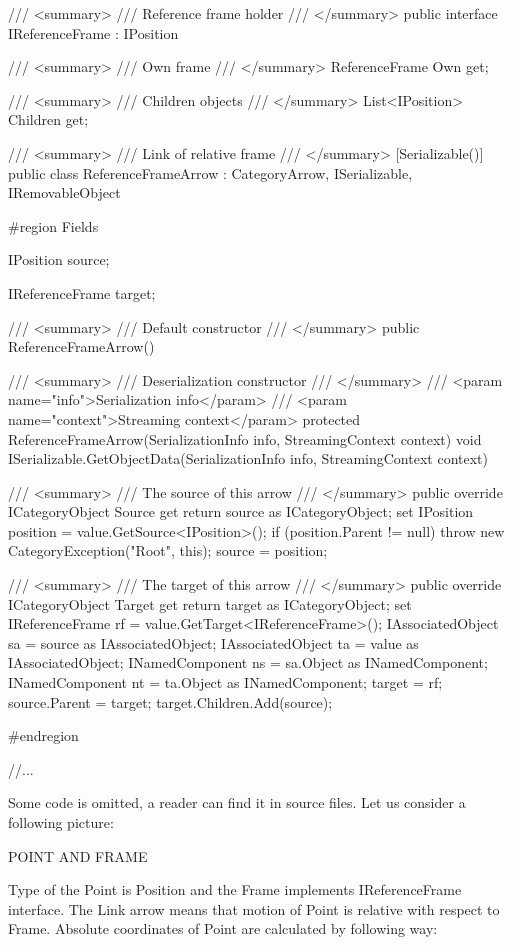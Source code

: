 \documentclass[10pt,journal,compsoc]{IEEEtran}
\begin{document}
/// <summary>
/// Reference frame holder
/// </summary>
public interface IReferenceFrame : IPosition
{
	/// <summary>
	/// Own frame
	/// </summary>
	ReferenceFrame Own
	{
		get;
	}
	
	/// <summary>
	/// Children objects
	/// </summary>
	List<IPosition> Children
	{
		get;
	}
	
}
/// <summary>
/// Link of relative frame
/// </summary>
[Serializable()]
public class ReferenceFrameArrow : CategoryArrow, ISerializable, IRemovableObject
{
	\#region Fields
	
	IPosition source;
	
	IReferenceFrame target;
	
	
	/// <summary>
	/// Default constructor
	/// </summary>
	public ReferenceFrameArrow()
	{
		
	}
	
	
	/// <summary>
	/// Deserialization constructor
	/// </summary>
	/// <param name="info">Serialization info</param>
	/// <param name="context">Streaming context</param>
	protected ReferenceFrameArrow(SerializationInfo info, StreamingContext context)
	{
	}
	void ISerializable.GetObjectData(SerializationInfo info, StreamingContext context)
	{
	}
	
	/// <summary>
	/// The source of this arrow
	/// </summary>
	public override ICategoryObject Source
	{
		get
		{
			return source as ICategoryObject;
		}
		set
		{
			IPosition position = value.GetSource<IPosition>();
			if (position.Parent != null)
			{
				throw new CategoryException("Root", this);
			}
			source = position;
		}
	}
	
	/// <summary>
	/// The target of this arrow
	/// </summary>
	public override ICategoryObject Target
	{
		get
		{
			return target as ICategoryObject;
		}
		set
		{
			IReferenceFrame rf = value.GetTarget<IReferenceFrame>();
			IAssociatedObject sa = source as IAssociatedObject;
			IAssociatedObject ta = value as IAssociatedObject;
			INamedComponent ns = sa.Object as INamedComponent;
			INamedComponent nt = ta.Object as INamedComponent;
			target = rf;
			source.Parent = target;
			target.Children.Add(source);
		}
	}
	
	
	\#endregion
	
	
	
	//...
	
}
Some code is omitted, a reader can find it in source files. Let us consider a following picture:

POINT AND FRAME

Type of the Point is Position and the Frame implements IReferenceFrame interface. The Link arrow means that motion of Point is relative with respect to Frame. Absolute coordinates of Point are calculated by following way: 
\end{document}
